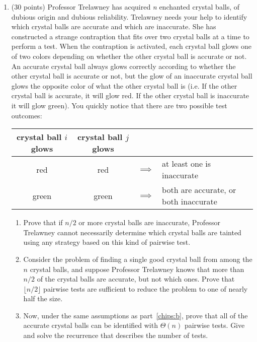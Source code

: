 \documentclass[12pt]{article}
\begin{document}
\begin{enumerate}
    \newpage

	\item (30 points)
	Professor Trelawney has acquired \textit{n} enchanted crystal balls, of dubious origin and dubious reliability. Trelawney needs your help to identify which crystal balls are accurate and which are inaccurate. She has constructed a strange contraption that fits over two crystal balls at a time to perform a test. When the contraption is activated, each crystal ball glows one of two colors depending on whether the other crystal ball is accurate or not. An accurate crystal ball always glows correctly according to whether the other crystal ball is accurate or not, but the glow of an inaccurate crystal ball glows the opposite color of what the other crystal ball is (i.e. If the other crystal ball is accurate, it will glow red. If the other crystal ball is inaccurate it will glow green). You quickly notice that there are two possible test outcomes:

	\begin{small}
    	\begin{center}
        	\begin{tabular}{ccll}
        	crystal ball $i$ glows & crystal ball $j$ glows & &  \\
        	\hline
        	red & red & $\implies$ & at least one is inaccurate \\
        	green & green & $\implies$ & both are accurate, or both inaccurate \\
        	\end{tabular}
    	\end{center}
	\end{small}

	\begin{enumerate}
    	\item Prove that if $n/2$ or more crystal balls are inaccurate, Professor Trelawney cannot necessarily determine which crystal balls are tainted using any strategy based on this kind of pairwise test.

    	\item \label{chips:b} Consider the problem of finding a single good crystal ball from among the $n$ crystal balls, and suppose Professor Trelawney knows that more than $n/2$ of the crystal balls are accurate, but not which ones. Prove that $\lfloor n/2\rfloor$ pairwise tests are sufficient to reduce the problem to one of nearly half the size.

    	\item Now, under the same assumptions as part~\eqref{chips:b}, prove that all of the accurate crystal balls can be identified with $\Theta(n)$ pairwise tests. Give and solve the recurrence that describes the number of tests.
	\end{enumerate}


\end{enumerate}
\end{document}
